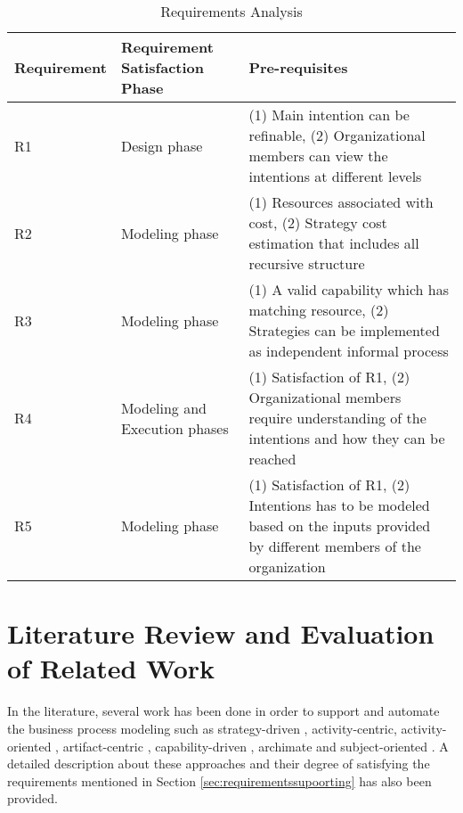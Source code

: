 \begin{table} [htbp]
	\centering
	\begin{tabular} {p{2.5cm}p{3cm}p{8cm}}
		\toprule
		\textbf{Requirement} & \textbf{Requirement Satisfaction Phase} & \textbf{Pre-requisites}    \\
		\midrule                                                                                                               
		R1    & Design phase    &(1) Main intention can be refinable, (2) Organizational members can view the intentions at different levels    \\ 
		
		R2   & Modeling phase    &(1) Resources associated with cost, (2) Strategy cost estimation that includes all recursive structure \\         
			
		R3   & Modeling phase       &(1) A valid capability which has matching resource, (2) Strategies can be implemented as independent informal process \\      
		
		R4   & Modeling and Execution phases     &(1) Satisfaction of R1, (2) Organizational members require understanding of the intentions and how they can be reached \\                         
			
		R5  &Modeling phase  &(1) Satisfaction of R1, (2) Intentions has to be modeled based on the inputs provided by different members of the organization               \\ 
		    
		\bottomrule
	\end{tabular}
	\caption{Requirements Analysis}
	\label{tab:subrequirements}
\end{table}

\section{Literature Review and Evaluation of Related Work}
\label{sec:literaturereview}
In the literature, several work has been done in order to support and automate the business process modeling such as strategy-driven \cite{Bider2005}, activity-centric\cite{Yarosh2009}, activity-oriented \cite{Reijers2006}, artifact-centric \cite{Cohn2009}, capability-driven \cite{Stirna2012}, archimate \cite{Aldea2015} and subject-oriented \cite{Fleischmann2013}.  A detailed description about these approaches and their degree of satisfying the requirements mentioned in Section \ref{sec:requirementssupoorting} has also been provided. 

